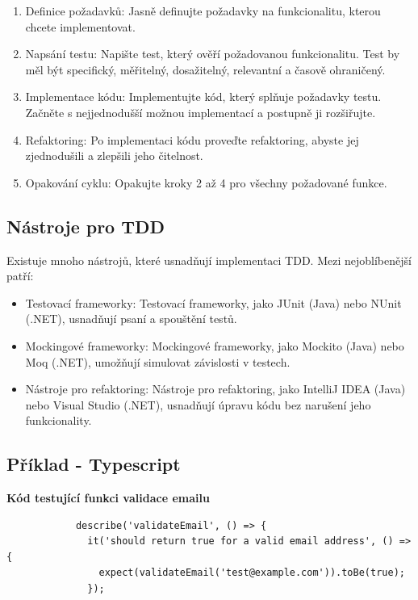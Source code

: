 \documentclass{article}
\begin{document}
\begin{Test Driven Development}
        \begin{enumerate}
            \item Definice požadavků: Jasně definujte požadavky na funkcionalitu, kterou chcete implementovat.
            \item Napsání testu: Napište test, který ověří požadovanou funkcionalitu.
            Test by měl být specifický, měřitelný, dosažitelný, relevantní a časově ohraničený.
            \item Implementace kódu: Implementujte kód, který splňuje požadavky testu.
            Začněte s nejjednodušší možnou implementací a postupně ji rozšiřujte.
            \item Refaktoring: Po implementaci kódu proveďte refaktoring, abyste jej zjednodušili a zlepšili jeho čitelnost.
            \item Opakování cyklu: Opakujte kroky 2 až 4 pro všechny požadované funkce.
        \end{enumerate}

        \subsection{Nástroje pro TDD}\label{subsec:nastroje-pro-tdd}

        Existuje mnoho nástrojů, které usnadňují implementaci TDD. Mezi nejoblíbenější patří:

        \begin{itemize}
            \item Testovací frameworky: Testovací frameworky, jako JUnit (Java) nebo NUnit (.NET), usnadňují psaní a spouštění testů.
            \item Mockingové frameworky: Mockingové frameworky, jako Mockito (Java) nebo Moq (.NET), umožňují simulovat závislosti v testech.
            \item Nástroje pro refaktoring: Nástroje pro refaktoring, jako IntelliJ IDEA (Java) nebo Visual Studio (.NET), usnadňují úpravu kódu bez narušení jeho funkcionality.
        \end{itemize}

        \break

        \subsection{Příklad - Typescript}\label{subsec:priklad---typescript}

        \textbf{\large Kód testující funkci validace emailu}
        \begin{verbatim}
            describe('validateEmail', () => {
              it('should return true for a valid email address', () => {
                expect(validateEmail('test@example.com')).toBe(true);
              });


\end{verbatim}
\end{Test Driven Development}
\end{document}
